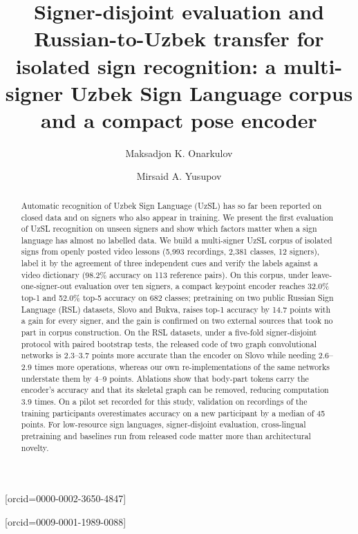 \documentclass[a4paper,fleqn]{cas-dc}
\begin{document}
\let\WriteBookmarks\relax
\def\floatpagepagefraction{1}
\def\textpagefraction{.001}
\title[mode=title]{Signer-disjoint evaluation and Russian-to-Uzbek transfer for isolated sign recognition: a multi-signer Uzbek Sign Language corpus and a compact pose encoder}
\author[1]{Maksadjon K. Onarkulov}[orcid=0000-0002-3650-4847]
\author[2]{Mirsaid A. Yusupov}[orcid=0009-0001-1989-0088]
\cormark[1]
\begin{abstract}
Automatic recognition of Uzbek Sign Language (UzSL) has so far been reported on closed data and on signers who also appear in training. We present the first evaluation of UzSL recognition on unseen signers and show which factors matter when a sign language has almost no labelled data. We build a multi-signer UzSL corpus of isolated signs from openly posted video lessons (5,993 recordings, 2,381 classes, 12 signers), label it by the agreement of three independent cues and verify the labels against a video dictionary (98.2\% accuracy on 113 reference pairs). On this corpus, under leave-one-signer-out evaluation over ten signers, a compact keypoint encoder reaches 32.0\% top-1 and 52.0\% top-5 accuracy on 682 classes; pretraining on two public Russian Sign Language (RSL) datasets, Slovo and Bukva, raises top-1 accuracy by 14.7 points with a gain for every signer, and the gain is confirmed on two external sources that took no part in corpus construction. On the RSL datasets, under a five-fold signer-disjoint protocol with paired bootstrap tests, the released code of two graph convolutional networks is 2.3–3.7 points more accurate than the encoder on Slovo while needing 2.6–2.9 times more operations, whereas our own re-implementations of the same networks understate them by 4–9 points. Ablations show that body-part tokens carry the encoder's accuracy and that its skeletal graph can be removed, reducing computation 3.9 times. On a pilot set recorded for this study, validation on recordings of the training participants overestimates accuracy on a new participant by a median of 45 points. For low-resource sign languages, signer-disjoint evaluation, cross-lingual pretraining and baselines run from released code matter more than architectural novelty.
\end{abstract}
\end{document}
